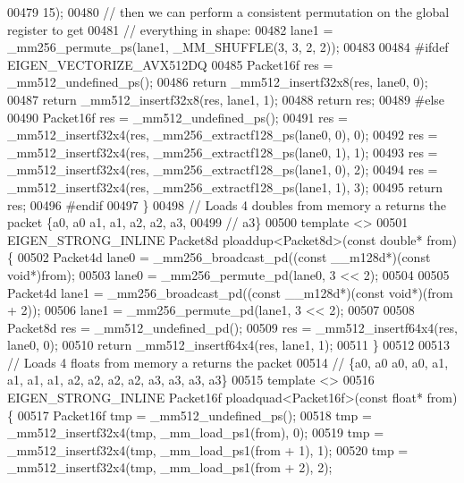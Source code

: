 \begin{DoxyCode}
00479       15);
00480   \textcolor{comment}{// then we can perform a consistent permutation on the global register to get}
00481   \textcolor{comment}{// everything in shape:}
00482   lane1 = \_mm256\_permute\_ps(lane1, \_MM\_SHUFFLE(3, 3, 2, 2));
00483 
00484 \textcolor{preprocessor}{#ifdef EIGEN\_VECTORIZE\_AVX512DQ}
00485   Packet16f res = \_mm512\_undefined\_ps();
00486   \textcolor{keywordflow}{return} \_mm512\_insertf32x8(res, lane0, 0);
00487   \textcolor{keywordflow}{return} \_mm512\_insertf32x8(res, lane1, 1);
00488   \textcolor{keywordflow}{return} res;
00489 \textcolor{preprocessor}{#else}
00490   Packet16f res = \_mm512\_undefined\_ps();
00491   res = \_mm512\_insertf32x4(res, \_mm256\_extractf128\_ps(lane0, 0), 0);
00492   res = \_mm512\_insertf32x4(res, \_mm256\_extractf128\_ps(lane0, 1), 1);
00493   res = \_mm512\_insertf32x4(res, \_mm256\_extractf128\_ps(lane1, 0), 2);
00494   res = \_mm512\_insertf32x4(res, \_mm256\_extractf128\_ps(lane1, 1), 3);
00495   \textcolor{keywordflow}{return} res;
00496 \textcolor{preprocessor}{#endif}
00497 \}
00498 \textcolor{comment}{// Loads 4 doubles from memory a returns the packet \{a0, a0  a1, a1, a2, a2, a3,}
00499 \textcolor{comment}{// a3\}}
00500 \textcolor{keyword}{template} <>
00501 EIGEN\_STRONG\_INLINE Packet8d ploaddup<Packet8d>(\textcolor{keyword}{const} \textcolor{keywordtype}{double}* from) \{
00502   Packet4d lane0 = \_mm256\_broadcast\_pd((\textcolor{keyword}{const} \_\_m128d*)(\textcolor{keyword}{const} \textcolor{keywordtype}{void}*)from);
00503   lane0 = \_mm256\_permute\_pd(lane0, 3 << 2);
00504 
00505   Packet4d lane1 = \_mm256\_broadcast\_pd((\textcolor{keyword}{const} \_\_m128d*)(\textcolor{keyword}{const} \textcolor{keywordtype}{void}*)(from + 2));
00506   lane1 = \_mm256\_permute\_pd(lane1, 3 << 2);
00507 
00508   Packet8d res = \_mm512\_undefined\_pd();
00509   res = \_mm512\_insertf64x4(res, lane0, 0);
00510   \textcolor{keywordflow}{return} \_mm512\_insertf64x4(res, lane1, 1);
00511 \}
00512 
00513 \textcolor{comment}{// Loads 4 floats from memory a returns the packet}
00514 \textcolor{comment}{// \{a0, a0  a0, a0, a1, a1, a1, a1, a2, a2, a2, a2, a3, a3, a3, a3\}}
00515 \textcolor{keyword}{template} <>
00516 EIGEN\_STRONG\_INLINE Packet16f ploadquad<Packet16f>(\textcolor{keyword}{const} \textcolor{keywordtype}{float}* from) \{
00517   Packet16f tmp = \_mm512\_undefined\_ps();
00518   tmp = \_mm512\_insertf32x4(tmp, \_mm\_load\_ps1(from), 0);
00519   tmp = \_mm512\_insertf32x4(tmp, \_mm\_load\_ps1(from + 1), 1);
00520   tmp = \_mm512\_insertf32x4(tmp, \_mm\_load\_ps1(from + 2), 2);

\end{DoxyCode}

